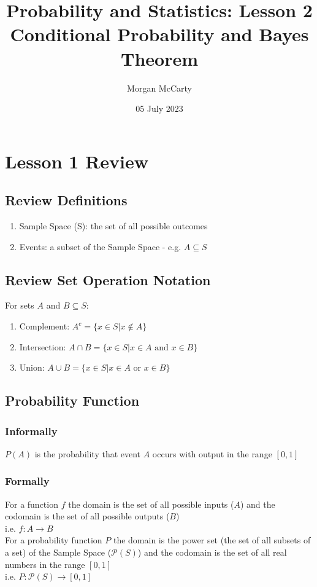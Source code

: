 \documentclass[12pt]{article}
\title{
    Probability and Statistics: Lesson 2
    \\Conditional Probability and Bayes Theorem}
\author{Morgan McCarty}
\date{05 July 2023}
\begin{document}
    \maketitle

    \section{Lesson 1 Review}
        \subsection{Review Definitions}
            \begin{enumerate}
                \item Sample Space (S): the set of all possible outcomes
                \item Events: a subset of the Sample Space - e.g. $A \subseteq S$
            \end{enumerate}
        \subsection{Review Set Operation Notation}
            For sets $A$ and $B \subseteq S$:
            \begin{enumerate}
                \item Complement: $A^c = \{x \in S | x \notin A\}$
                \item Intersection: $A \cap B = \{x \in S | x \in A \text{ and } x \in B\}$
                \item Union: $A \cup B = \{x \in S | x \in A \text{ or } x \in B\}$
            \end{enumerate}
        \subsection{Probability Function}
            \subsubsection{Informally}
                $P(A)$ is the probability that event $A$ occurs with output in the range $[0, 1]$
            \subsubsection{Formally}
                For a function $f$ the domain is the set of all possible inputs ($A$) and the codomain is the set of all possible outputs ($B$)
                \\i.e. $f: A \rightarrow B$
                \\For a probability function $P$ the domain is the power set (the set of all subsets of a set) of the Sample Space ($\mathcal{P}(S)$) and the codomain is the set of all real numbers in the range $[0, 1]$
                \\i.e. $P: \mathcal{P}(S) \rightarrow [0, 1]$
\end{document}

